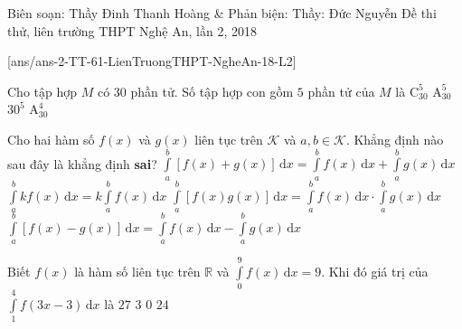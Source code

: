 \begin{name}
{Biên soạn: Thầy Đinh Thanh Hoàng \& Phản biện: Thầy: Đức Nguyễn}
{Đề thi thử, liên trường THPT Nghệ An, lần 2, 2018}
\end{name}
\setcounter{ex}{0}
[ans/ans-2-TT-61-LienTruongTHPT-NgheAn-18-L2]

\begin{ex}%
Cho tập hợp $M$ có $30$ phần tử. Số tập hợp con gồm $5$ phần tử của $M$ là
\choice
{\True $\mathrm{C}_{30}^5$}
{$\mathrm{A}_{30}^5$}
{$30^5$}
{$\mathrm{A}_{30}^4$}
\end{ex}

\begin{ex}%
Cho hai hàm số $f(x)$ và $g(x)$ liên tục trên $\mathscr{K}$ và $a, b \in \mathscr{K}$. Khẳng định nào sau đây là khẳng định \textbf{sai}?
\choice
{$\displaystyle\int\limits_a^b\left[f(x) + g(x)\right]\mathrm{\,d}x = \displaystyle\int\limits_a^b f(x)\mathrm{\,d}x + \displaystyle\int\limits_a^b g(x)\mathrm{\,d}x$}
{$\displaystyle\int\limits_a^b kf(x)\mathrm{\,d}x = k\displaystyle\int\limits_a^b f(x)\mathrm{\,d}x$}
{\True $\displaystyle\int\limits_a^b\left[f(x)g(x)\right]\mathrm{\,d}x = \displaystyle\int\limits_a^b f(x)\mathrm{\,d}x \cdot \displaystyle\int\limits_a^b g(x)\mathrm{\,d}x$}
{$\displaystyle\int\limits_a^b\left[f(x) - g(x)\right]\mathrm{\,d}x = \displaystyle\int\limits_a^b f(x)\mathrm{\,d}x - \displaystyle\int\limits_a^b g(x)\mathrm{\,d}x$}
\end{ex}

\begin{ex}%
Biết $f(x)$ là hàm số liên tục trên $\mathbb{R}$ và $\displaystyle\int\limits_0^9 f(x)\mathrm{\,d}x = 9$. Khi đó giá trị của $\displaystyle\int\limits_1^4 f(3x-3)\mathrm{\,d}x$ là
\choice
{$27$}
{\True $3$}
{$0$}
{$24$}
\end{ex}

